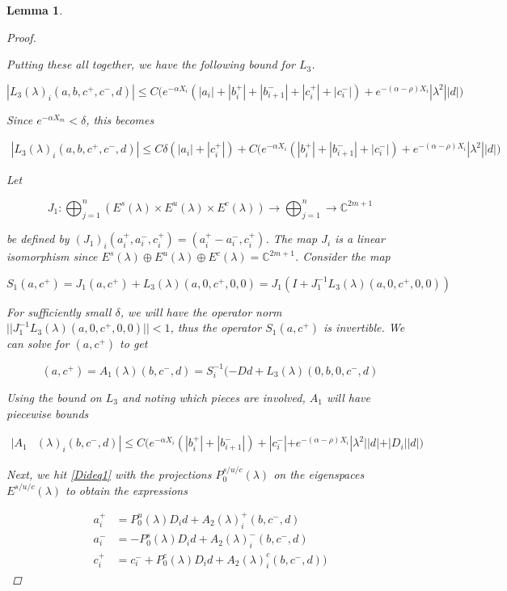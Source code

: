 \documentclass[12pt]{article}
\def\C{{\mathbb C}}
\newtheorem{lemma}{Lemma}
\begin{document}
\begin{lemma}
\begin{proof}
\begin{enumerate}
\end{enumerate}

Putting these all together, we have the following bound for $L_3$.

\begin{equation}\label{L3bound}
|L_3(\lambda)_i(a, b, c^+, c^-, d)| \leq C \Big( e^{-\alpha X_i} ( |a_i| + |b_i^+| + |b_{i+1}^-| + |c_i^+| + |c_i^-|) + e^{-(\alpha - \rho) X_i} |\lambda^2| |d| \Big)
\end{equation}

Since $e^{-\alpha X_m} < \delta$, this becomes

\begin{align*}
|L_3(\lambda)_i(a, b, c^+, c^-, d)| \leq C \delta ( |a_i| + |c_i^+| ) + C\Big( e^{-\alpha X_i} ( |b_i^+| + |b_{i+1}^-| + |c_i^-|) + e^{-(\alpha - \rho) X_i} |\lambda^2| |d| \Big)
\end{align*}

Let 

\[
J_1: \bigoplus_{j=1}^n (E^s(\lambda) \times E^u(
\lambda) \times E^c(\lambda) ) \rightarrow \bigoplus_{j=1}^n \rightarrow \C^{2m+1}
\]

be defined by $(J_1)_i(a_i^+, a_i^-, c_i^+) = (a_i^+ - a_i^-, c_i^+)$. The map $J_i$ is a linear isomorphism since $E^s(\lambda) \oplus E^u(\lambda) \oplus E^c(\lambda) = \C^{2m + 1}$. Consider the map

\[
S_1(a, c^+) = J_1 (a, c^+) + L_3(\lambda)(a, 0, c^+, 0, 0) = J_1( I + J_1^{-1} L_3(\lambda)(a, 0, c^+, 0, 0))
\]

For sufficiently small $\delta$, we will have the operator norm $||J_1^{-1} L_3(\lambda)(a, 0, c^+, 0, 0)|| < 1$, thus the operator $S_1(a, c^+)$ is invertible. We can solve for $(a, c^+)$ to get

\[
(a, c^+) = A_1(\lambda)(b, c^-, d) = S_i^{-1}(-D d + L_3(\lambda)(0, b, 0, c^-, d)
\]

Using the bound on $L_3$ and noting which pieces are involved, $A_1$ will have piecewise bounds

\begin{align*}
|A_1&(\lambda)_i(b, c^-, d)|
\leq C \Big( e^{-\alpha X_i} (|b_i^+| + |b_{i+1}^-|) + |c_i^-| + e^{-(\alpha - \rho) X_i} |\lambda^2||d| + |D_i||d| \Big)
\end{align*} 

Next, we hit \eqref{Dideq1} with the projections $P_0^{s/u/c}(\lambda)$ on the eigenspaces $E^{s/u/c}(\lambda)$ to obtain the expressions

\begin{align*}
a_i^+ &= P_0^u(\lambda) D_i d + A_2(\lambda)_i^+(b, c^-, d) \\
a_i^- &= -P_0^s(\lambda) D_i d + A_2(\lambda)_i^-(b, c^-, d) \\
c_i^+ &= c_i^- + P_0^c(\lambda) D_i d + A_2(\lambda)_i^c(b, c^-, d) )
\end{align*}


\end{proof}
\end{lemma}
\end{document}
